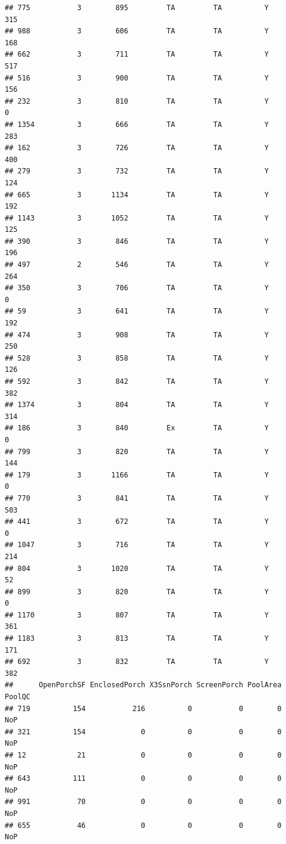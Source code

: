 \documentclass[]{article}
\begin{document}
\begin{verbatim}
## 775           3        895         TA         TA          Y        315
## 988           3        606         TA         TA          Y        168
## 662           3        711         TA         TA          Y        517
## 516           3        900         TA         TA          Y        156
## 232           3        810         TA         TA          Y          0
## 1354          3        666         TA         TA          Y        283
## 162           3        726         TA         TA          Y        400
## 279           3        732         TA         TA          Y        124
## 665           3       1134         TA         TA          Y        192
## 1143          3       1052         TA         TA          Y        125
## 390           3        846         TA         TA          Y        196
## 497           2        546         TA         TA          Y        264
## 350           3        706         TA         TA          Y          0
## 59            3        641         TA         TA          Y        192
## 474           3        908         TA         TA          Y        250
## 528           3        858         TA         TA          Y        126
## 592           3        842         TA         TA          Y        382
## 1374          3        804         TA         TA          Y        314
## 186           3        840         Ex         TA          Y          0
## 799           3        820         TA         TA          Y        144
## 179           3       1166         TA         TA          Y          0
## 770           3        841         TA         TA          Y        503
## 441           3        672         TA         TA          Y          0
## 1047          3        716         TA         TA          Y        214
## 804           3       1020         TA         TA          Y         52
## 899           3        820         TA         TA          Y          0
## 1170          3        807         TA         TA          Y        361
## 1183          3        813         TA         TA          Y        171
## 692           3        832         TA         TA          Y        382
##      OpenPorchSF EnclosedPorch X3SsnPorch ScreenPorch PoolArea PoolQC
## 719          154           216          0           0        0    NoP
## 321          154             0          0           0        0    NoP
## 12            21             0          0           0        0    NoP
## 643          111             0          0           0        0    NoP
## 991           70             0          0           0        0    NoP
## 655           46             0          0           0        0    NoP

\end{verbatim}
\end{document}
